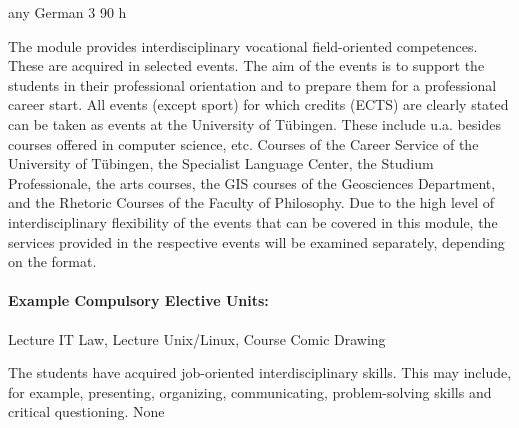 {any}
{German}
{3}
{90 h}
{The module provides interdisciplinary vocational field-oriented competences. These are acquired in selected events. The aim of the events is to support the students in their professional orientation and to prepare them for a professional career start. All events (except sport) for which credits (ECTS) are clearly stated can be taken as events at the University of Tübingen. These include u.a. besides courses offered in computer science, etc. Courses of the Career Service of the University of Tübingen, the Specialist Language Center, the Studium Professionale, the arts courses, the GIS courses of the Geosciences Department, and the Rhetoric Courses of the Faculty of Philosophy. Due to the high level of interdisciplinary flexibility of the events that can be covered in this module, the services provided in the respective events will be examined separately, depending on the format.
\paragraph{Example Compulsory Elective Units:} Lecture IT Law, Lecture Unix/Linux, Course Comic Drawing} 
{The students have acquired job-oriented interdisciplinary skills. This may include, for example, presenting, organizing, communicating, problem-solving skills and critical questioning.}
{None}